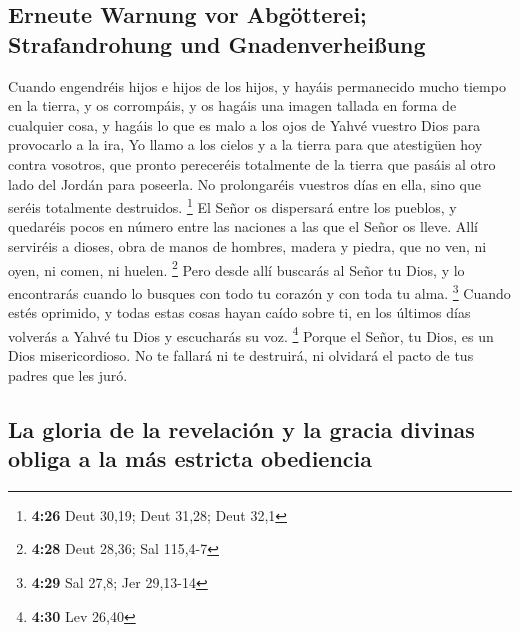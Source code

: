 \hypertarget{erneute-warnung-vor-abguxf6tterei-strafandrohung-und-gnadenverheiuxdfung}{%
\subsection{Erneute Warnung vor Abgötterei; Strafandrohung und
Gnadenverheißung}\label{erneute-warnung-vor-abguxf6tterei-strafandrohung-und-gnadenverheiuxdfung}}

 Cuando engendréis hijos e hijos de los hijos, y hayáis
permanecido mucho tiempo en la tierra, y os corrompáis, y os hagáis una
imagen tallada en forma de cualquier cosa, y hagáis lo que es malo a los
ojos de Yahvé vuestro Dios para provocarlo a la ira,  Yo
llamo a los cielos y a la tierra para que atestigüen hoy contra
vosotros, que pronto pereceréis totalmente de la tierra que pasáis al
otro lado del Jordán para poseerla. No prolongaréis vuestros días en
ella, sino que seréis totalmente destruidos. \footnote{\textbf{4:26}
  Deut 30,19; Deut 31,28; Deut 32,1}  El Señor os
dispersará entre los pueblos, y quedaréis pocos en número entre las
naciones a las que el Señor os lleve.  Allí serviréis a
dioses, obra de manos de hombres, madera y piedra, que no ven, ni oyen,
ni comen, ni huelen. \footnote{\textbf{4:28} Deut 28,36; Sal 115,4-7}
 Pero desde allí buscarás al Señor tu Dios, y lo
encontrarás cuando lo busques con todo tu corazón y con toda tu alma.
\footnote{\textbf{4:29} Sal 27,8; Jer 29,13-14}  Cuando
estés oprimido, y todas estas cosas hayan caído sobre ti, en los últimos
días volverás a Yahvé tu Dios y escucharás su voz. \footnote{\textbf{4:30}
  Lev 26,40}  Porque el Señor, tu Dios, es un Dios
misericordioso. No te fallará ni te destruirá, ni olvidará el pacto de
tus padres que les juró.

\hypertarget{la-gloria-de-la-revelaciuxf3n-y-la-gracia-divinas-obliga-a-la-muxe1s-estricta-obediencia}{%
\subsection{La gloria de la revelación y la gracia divinas obliga a la
más estricta
obediencia}\label{la-gloria-de-la-revelaciuxf3n-y-la-gracia-divinas-obliga-a-la-muxe1s-estricta-obediencia}}

